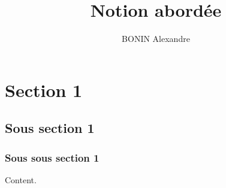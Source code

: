 \documentclass[french]{article}
\title{Notion abordée}
\author{BONIN Alexandre}
\begin{document}
\maketitle

\tableofcontents

\section{Section 1}

\subsection{Sous section 1}

\subsubsection{Sous sous section 1}

Content.
\end{document}
